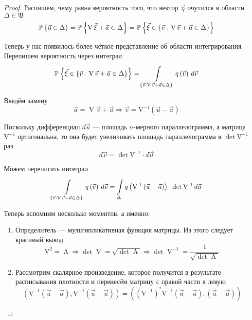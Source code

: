 \begin{proof}
  Распишем, чему равна вероятность того, что вектор $\vec{\eta}$ очутился
  в области $\Delta \in \mathfrak{B}$
  \begin{equation}\label{eq:gaussVectorProbabilityStart}
      \Probability{\vec{\eta} \in \Delta}
      = \Probability{\operatorname{V} \vec{\xi} + \vec{a} \in \Delta}
      = \Probability{\vec{\xi} \in \left\{ \vec{v}:
      \operatorname{V} \vec{v} + \vec{a} \in \Delta \right\}}
  \end{equation}

  Теперь у нас появилось более чёткое представление об области интегрирования.
  Перепишем вероятность через интеграл
  $$\Probability{\vec{\xi} \in \left\{ \vec{v}:
      \operatorname{V} \vec{v} + \vec{a} \in \Delta \right\}}
      = \integrall{\left\{ \vec{v}: \operatorname{V} \vec{v} + \vec{a}
      \in \Delta \right\}}{d\vec{v}}{q\left( \vec{v} \right)}$$

  Введём замену
  $$\vec{u} = \operatorname{V} \vec{v} + \vec{a}
      \Rightarrow
      \vec{v} = \operatorname{V^{-1}} \left( \vec{u} - \vec{a} \right)$$

  Поскольку дифференциал $d\vec{u}$ --- площадь $n$-мерного параллелограмма,
  а матрица $\operatorname{V^{-1}}$ ортогональна, то она будет увеличивать
  площадь параллелограмма в $\det{\operatorname{V^{-1}}}$ раз
  $$d\vec{v} = \det{\operatorname{V^{-1}}} \cdot d\vec{u}$$

  Можем переписать интеграл
  \begin{equation}\label{eq:gaussDencityIntegral}
  \integrall{\left\{ \vec{v}: \operatorname{V} \vec{v} + \vec{a}
      \in \Delta \right\}}{d\vec{v}}{q\left( \vec{v} \right)}
      = \integrall{\Delta}{d\vec{u}}{ q\left( \operatorname{V^{-1}}
          \left( \vec{u} - \vec{a} \right) \right)
      \cdot \det{\operatorname{V^{-1}}}}
  \end{equation}

  Теперь вспомним несколько моментов, а именно:
  \begin{enumerate}
      \item Определитель --- мультипликативная функция матрицы. Из этого
      следует красивый вывод
      $$\operatorname{V^2} = \operatorname{A}
          \Rightarrow \det{\operatorname{V}}
        = \sqrt{\det{\operatorname{A}}}
          \Rightarrow \det{\operatorname{V}^{-1}}
        = \frac{1}{\sqrt{\det{\operatorname{A}}}}$$
      \item Рассмотрим скалярное произведение, которое получится в результате
      расписывания плотности и перенесём матрицу с правой части в левую
      $$\left( \operatorname{V^{-1}} \left( \vec{u} - \vec{a} \right),
        \operatorname{V^{-1}} \left( \vec{u} - \vec{a} \right)
        \right)
          = \left( \left( \operatorname{V^{-1}} \right)^*
            \operatorname{V^{-1}} \left( \vec{u} - \vec{a} \right),
            \left( \vec{u} - \vec{a} \right) \right)$$


\end{enumerate}
\end{proof}
